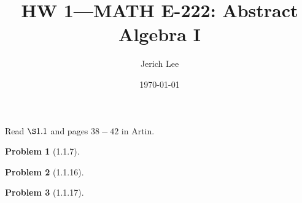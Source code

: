 \documentclass[12pt]{article}
\title{HW 1—MATH E-222: Abstract Algebra I}
\author{Jerich Lee}
\date{\today}
\theoremstyle{definition} %
\newtheorem{problem}{Problem}
\theoremstyle{plain} %
\begin{document}
\maketitle
\noindent
Read $\S 1.1$ and pages $38-42$ in Artin.  
\begin{problem}[1.1.7]
    
\end{problem}
\begin{problem}[1.1.16]
    
\end{problem}
\begin{problem}[1.1.17]
    
\end{problem}
\end{document}
